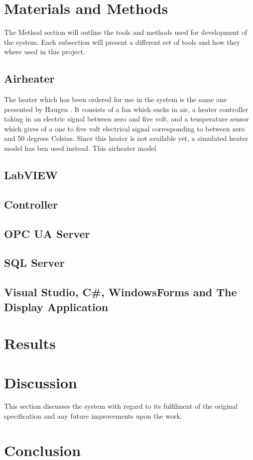\documentclass[11pt, A4paper, english]{article}
\begin{document}
\begin{multicols}{2}
		
		\section{Materials and Methods}
The Method section will outline the tools and methods used for development of the system. Each subsection will present a different set of tools and how they where used in this project.
		
		\subsection{Airheater}
The heater which has been ordered for use in the system is the same one presented by Haugen \cite{airheater}. It consists of a fan which sucks in air, a heater controller taking in an electric signal between zero and five volt, and a temperature sensor which gives of a one to five volt electrical signal corresponding to between zero and 50 degrees Celsius. Since this heater is not available yet, a simulated heater model \cite{airheatermodel} has ben used instead. This airheater model 
		
		\subsection{LabVIEW}
		
		
		\subsection{Controller}
		
		
		\subsection{OPC UA Server}
		
		
		\subsection{SQL Server}
		
		
		\subsection{Visual Studio, C#, WindowsForms and The Display Application}
		
		\section{Results}
		
		
		\section{Discussion}
This section discusses the system with regard to its fulfilment of the original specification and any future improvements upon the work.
		
		
		\section{Conclusion}
		
		
\printbibliography
		
	\end{multicols}
\end{document}
